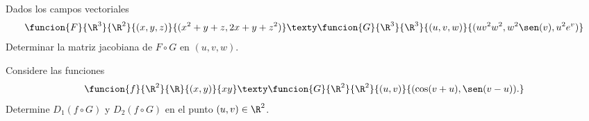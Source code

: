 \documentclass[a4,11pt]{aleph-examen}
\begin{document}
\begin{preguntas}
\begin{respuesta}
\begin{respuesta}
\item
	Dados los campos vectoriales
    \[
        \funcion{F}{\R^3}{\R^2}{(x,y,z)}{(x^2+y+z,2x+y+z^2)}
        \texty
        \funcion{G}{\R^3}{\R^3}{(u,v,w)}{(uv^2w^2,w^2\sen(v),u^2e^v)}
    \]
    Determinar la matriz jacobiana de $F\circ G$ en $(u,v,w)$.


\item
    Considere las funciones
	\[
 	    \funcion{f}{\R^2}{\R}{(x,y)}{xy}
 	    \texty 
 	    \funcion{G}{\R^2}{\R^2}{(u,v)}{(\cos(v+u),\sen(v-u)).}
    \]
	Determine $D_1(f\circ G)$ y $D_2(f\circ G)$ en el punto $(u,v)\in\R^2$.
     

\end{respuesta}
\end{respuesta}
\end{preguntas}
\end{document}
